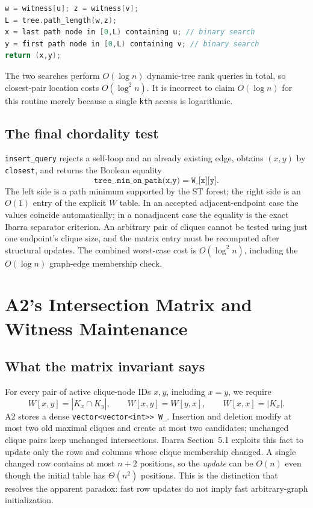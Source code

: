 \begin{lstlisting}[language=C++,caption={Conceptual A2 closest-pair search; actual code uses two integer bounds.}]
w = witness[u]; z = witness[v];
L = tree.path_length(w,z);
x = last path node in [0,L) containing u; // binary search
y = first path node in [0,L) containing v; // binary search
return (x,y);
\end{lstlisting}
The two searches perform \(O(\log n)\) dynamic-tree rank queries in total, so closest-pair location costs \(O(\log^2 n)\).  It is incorrect to claim \(O(\log n)\) for this routine merely because a single \texttt{kth} access is logarithmic.

\subsection{The final chordality test}
\texttt{insert\_query} rejects a self-loop and an already existing edge, obtains \((x,y)\) by \texttt{closest}, and returns the Boolean equality
\[
\texttt{tree\_.min\_on\_path(x,y)}=\texttt{W\_[x][y]}.
\]
The left side is a path minimum supported by the ST forest; the right side is an \(O(1)\) entry of the explicit \(W\) table.  In an accepted adjacent-endpoint case the values coincide automatically; in a nonadjacent case the equality is the exact Ibarra separator criterion.  An arbitrary pair of cliques cannot be tested using just one endpoint's clique size, and the matrix entry must be recomputed after structural updates.  The combined worst-case cost is \(O(\log^2 n)\), including the \(O(\log n)\) graph-edge membership check.

\section{A2's Intersection Matrix and Witness Maintenance}
\label{sec:a2-matrix-full}
\subsection{What the matrix invariant says}
For every pair of active clique-node IDs \(x,y\), including \(x=y\), we require
\[
 W[x,y]=|K_x\cap K_y|,
 \qquad W[x,y]=W[y,x],\qquad W[x,x]=|K_x|.
\]
A2 stores a dense \texttt{vector<vector<int>> W\_}.  Insertion and deletion modify at most two old maximal cliques and create at most two candidates; unchanged clique pairs keep unchanged intersections.  Ibarra Section~5.1 exploits this fact to update only the rows and columns whose clique membership changed.  A single changed row contains at most \(n+2\) positions, so the \emph{update} can be \(O(n)\) even though the initial table has \(\Theta(n^2)\) positions.  This is the distinction that resolves the apparent paradox: fast row updates do not imply fast arbitrary-graph initialization.

